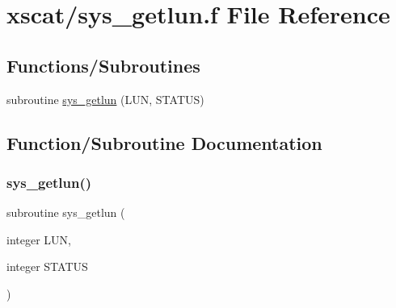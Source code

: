 \hypertarget{xscat_2sys__getlun_8f}{}\section{xscat/sys\+\_\+getlun.f File Reference}
\label{xscat_2sys__getlun_8f}
\subsection*{Functions/\+Subroutines}
\begin{DoxyCompactItemize}
\item 
subroutine \hyperlink{xscat_2sys__getlun_8f_aa6de0ee0eb7b66980dc5c8376257dfea}{sys\+\_\+getlun} (L\+UN, S\+T\+A\+T\+US)
\end{DoxyCompactItemize}


\subsection{Function/\+Subroutine Documentation}
\mbox{\label{xscat_2sys__getlun_8f_aa6de0ee0eb7b66980dc5c8376257dfea}} 
\subsubsection{\texorpdfstring{sys\+\_\+getlun()}{sys\_getlun()}}
{\footnotesize\ttfamily subroutine sys\+\_\+getlun (\begin{DoxyParamCaption}\item[{integer}]{L\+UN,  }\item[{integer}]{S\+T\+A\+T\+US }\end{DoxyParamCaption})}

